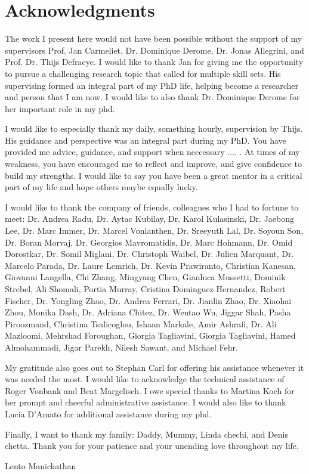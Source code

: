 
\chapter{Acknowledgments}

The work I present here would not have been possible without the support of my supervisors Prof. Jan Carmeliet, Dr. Dominique Derome, Dr. Jonas Allegrini, and Prof. Dr. Thijs Defraeye. I would like to thank Jan for giving me the opportunity to pursue a challenging research topic that called for multiple skill sets. His supervising formed an integral part of my PhD life, helping become a researcher and person that I am now. I would like to also thank Dr. Dominique Derome for her important role in my phd. 

I would like to especially thank my daily, something hourly, supervision by Thijs. His guidance and perspective was an integral part during my PhD. You have provided me advice, guidance, and support when neccessary .... . At times of my weakness, you have encouraged me to reflect and improve, and give confidence to build my strengths. I would like to say you have been a great mentor in a critical part of my life and hope others maybe equally lucky. 

I would like to thank the company of friends, colleagues who I had to fortune to meet: Dr. Andrea Radu, Dr. Aytac Kubilay, Dr. Karol Kulasinski, Dr. Jaebong Lee, Dr. Marc Immer, Dr. Marcel Vonlanthen, Dr. Sreeyuth Lal, Dr. Soyoun Son, Dr. Boran Morvaj, Dr. Georgios Mavromatidis, Dr. Marc Hohmann, Dr. Omid Dorostkar, Dr. Somil Miglani, Dr. Christoph Waibel, Dr. Julien Marquant, Dr. Marcelo Parada, Dr. Laure Lemrich, Dr. Kevin Prawiranto, Christian Kanesan, Giovanni Langella, Chi Zhang, Mingyang Chen, Gianluca Mussetti, Dominik Strebel, Ali Shomali, Portia Murray, Cristina Dominguez Hernandez, Robert Fischer, Dr. Yongling Zhao, Dr. Andrea Ferrari, Dr. Jianlin Zhao, Dr. Xiaohai Zhou, Monika Dash, Dr. Adriana Chitez, Dr. Wentao Wu, Jiggar Shah, Pasha Piroozmand, Christina Tsalicoglou, Ishaan Markale, Amir Ashrafi, Dr. Ali Mazloomi, Mehrshad Foroughan, Giorgia Tagliavini, Giorgia Tagliavini, Hamed Almohammadi, Jigar Parekh, Nilesh Sawant, and Michael Fehr.

My gratitude also goes out to Stephan Carl for offering his assistance whenever it was needed the most. I would like to acknowledge the technical assistance of Roger Vonbank and Beat Margelisch. I owe special thanks to Martina Koch for her prompt and cheerful administrative assistance. I would also like to thank Lucia D'Amato for additional assistance during my phd.

Finally, I want to thank my family: Daddy, Mummy, Linda chechi, and Denis chetta. Thank you for your patience and your unending love throughout my life.

\begin{flushright}
Lento Manickathan\\
\myMonthYear
\end{flushright}
	

